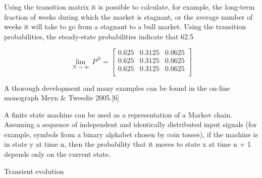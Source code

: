 Using the transition matrix it is possible to calculate, for example, the long-term fraction of weeks during which the market is stagnant, or the average number of weeks it will take to go from a stagnant to a bull market. Using the transition probabilities, the steady-state probabilities indicate that 62.5%

\[\lim_{N\to \infty } \, P^N=
\begin{bmatrix}
 0.625 & 0.3125 & 0.0625 \\
 0.625 & 0.3125 & 0.0625 \\
 0.625 & 0.3125 & 0.0625 \\
\end{bmatrix}\]

A thorough development and many examples can be found in the on-line monograph Meyn & Tweedie 2005.[6]

A finite state machine can be used as a representation of a Markov chain. Assuming a sequence of independent and identically distributed input signals (for example, symbols from a binary alphabet chosen by coin tosses), if the machine is in state y at time n, then the probability that it moves to state x at time n + 1 depends only on the current state.

Transient evolution
